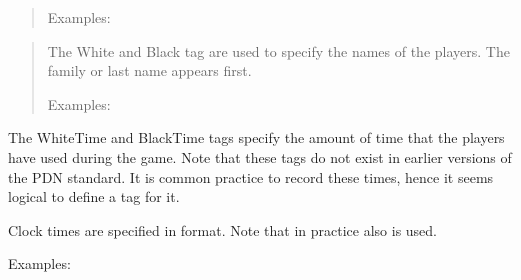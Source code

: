 \documentclass[letterpaper,10pt,english]{sphinxmanual}
\begin{document}
\sphinxAtStartPar
{}
\begin{quote}

\sphinxAtStartPar
Examples:

\begin{sphinxVerbatim}[commandchars=\\\{\}]
\PYG{p}{[} \PYG{p}{]}
\PYG{p}{[} \PYG{p}{]}
\PYG{p}{[} \PYG{p}{]}
\end{sphinxVerbatim}
\end{quote}

\sphinxAtStartPar
{}
\begin{quote}

\sphinxAtStartPar
The White and Black tag are used to specify the names of the players.
The family or last name appears first.

\sphinxAtStartPar
Examples:

\begin{sphinxVerbatim}[commandchars=\\\{\}]
\PYG{p}{[} \PYG{p}{]}
\PYG{p}{[} \PYG{p}{]}
\PYG{p}{[} \PYG{p}{]}
\PYG{p}{[} \PYG{p}{]}
\end{sphinxVerbatim}
\end{quote}
\begin{description}
\sphinxAtStartPar
The WhiteTime and BlackTime tags specify the amount of time that the players
have used during the game. Note that these tags do not exist in earlier versions
of the PDN standard. It is common practice to record these times, hence it seems
logical to define a tag for it.

\sphinxAtStartPar
Clock times are specified in  format. Note that in practice also
 is used.

\sphinxAtStartPar
{}

\sphinxAtStartPar
Examples:

\begin{sphinxVerbatim}[commandchars=\\\{\}]
\PYG{p}{[} \PYG{p}{]}
\PYG{p}{[} \PYG{p}{]}
\end{sphinxVerbatim}

\end{description}
\end{document}

